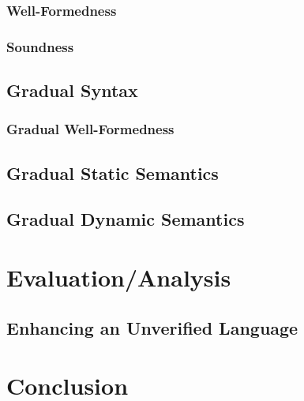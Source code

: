     \subsection{Well-Formedness}
    \label{sec:well-formedness}
    
    
    \subsection{Soundness}
    \label{ssec:soundness}
    

\section{Gradual Syntax}
\label{sec:cs-gradual-formulas}

    
\subsection{Gradual Well-Formedness}
\label{ssec:well-formedness}


\section{Gradual Static Semantics}
\label{sec:gradualize-hoare-rules}


\section{Gradual Dynamic Semantics}
\label{sec:gradual-dyn--semantics}




\chapter{Evaluation/Analysis}
\label{ch:evaluation-analysis}


\section{Enhancing an Unverified Language}
\label{sec:enhancing-an-unverified}



\chapter{Conclusion}
\label{ch:conclusion}


